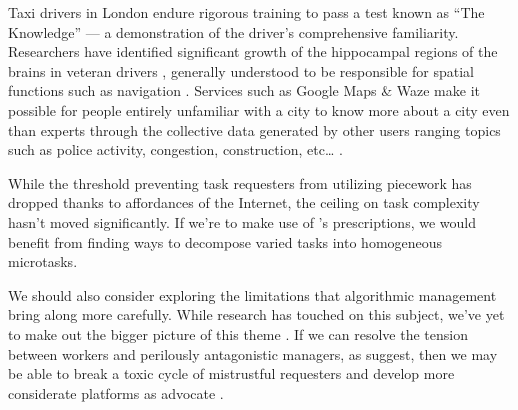 \documentclass[trackingWork]{subfiles}
\begin{document}
Taxi drivers in London endure rigorous training to pass a test known as ``The Knowledge''
--- a demonstration of the driver's comprehensive familiarity.
Researchers have identified significant growth of
the hippocampal regions of the brains in veteran drivers%
, generally understood to be responsible for spatial functions such as navigation
\cite{Maguire11042000,Maguire2894,Skok:1999:KML:299513.299625%
,       skok2000managing,Woollett1407,woollett2011acquiring}.
Services such as Google Maps \& Waze make it possible for
people entirely unfamiliar with a city
to know more about a city even than experts through
the collective data generated by other users
ranging topics such as police activity, congestion, construction, etc\dots
\cite{silva2013traffic,hind2014outsmarting}. 

\subsubsubsection{\implication}
While the threshold preventing task requesters from utilizing piecework
has dropped thanks to affordances of the Internet, the ceiling on task complexity hasn't moved significantly. 
If we're to make use of \citeauthor{Brown01041990}'s prescriptions,
we would benefit from finding ways to decompose varied tasks into homogeneous microtasks. 

We should also consider exploring the limitations that algorithmic management bring along more carefully.
While research has touched on this subject, we've yet to make out the bigger picture of this theme
\cite{uberAlgorithm}.
If we can resolve the tension between workers and perilously antagonistic managers, as \citeauthor{10.2307/2118435} suggest,
then we may be able to break a toxic cycle of mistrustful requesters \cite[for example][]{MaliciousCrowdworkersGadiraju}
and develop more considerate platforms as \citeauthor{takingAHITMcInnis} advocate
\cite{takingAHITMcInnis}.
\end{document}
